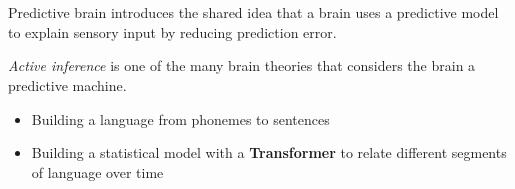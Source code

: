 \section{}

    \begin{frame}[allowframebreaks]{Predictive brain}
        \cite{spratling-2017-a-review-of-predictive-coding-algorithms} introduces the shared idea that a brain uses a predictive model to explain sensory input by reducing prediction error.

        \textit{Active inference} \cite{friston-2005-a-predictive-brain-how-perception-and-action-are-coupled-in-neural-networks} is one of the many brain theories that considers the brain a predictive machine.

        \begin{itemize}
            \item Building a language from phonemes to sentences
            \item Building a statistical model with a \textbf{Transformer} to relate different segments of language over time
        \end{itemize}


    \end{frame}

    \subsection{}
        
        


